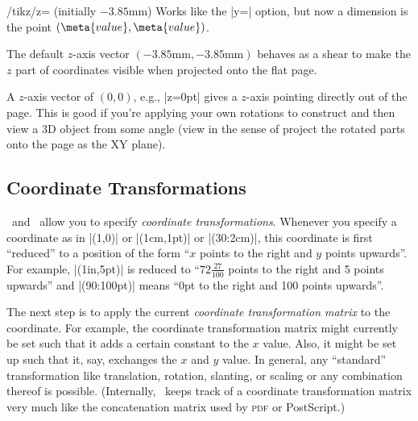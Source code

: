 \begin{key}{/tikz/z= (initially \normalfont$-3.85$mm)}
    Works like the |y=| option, but now a dimension is the point
    $(\meta{value},\meta{value})$.

    The default $z$-axis vector $(-3.85\text{mm},-3.85\text{mm})$ behaves as a
    shear to make the $z$ part of coordinates visible when projected onto the
    flat page.

    A $z$-axis vector of $(0,0)$, e.g., |z=0pt| gives a $z$-axis pointing
    directly out of the page.  This is good if you're applying your own
    rotations to construct and then view a 3D object from some angle (view in
    the sense of project the rotated parts onto the page as the XY plane).
\begin{codeexample}[]
\end{codeexample}
\end{key}


\subsection{Coordinate Transformations}

\pgfname\ and \tikzname\ allow you to specify \emph{coordinate
transformations}. Whenever you specify a coordinate as in |(1,0)| or
|(1cm,1pt)| or |(30:2cm)|, this coordinate is first ``reduced'' to a position
of the form ``$x$ points to the right and $y$ points upwards''. For example,
|(1in,5pt)| is reduced to ``$72\frac{27}{100}$ points to the right and 5 points
upwards'' and |(90:100pt)| means ``0pt to the right and 100 points upwards''.

The next step is to apply the current \emph{coordinate transformation matrix}
to the coordinate. For example, the coordinate transformation matrix might
currently be set such that it adds a certain constant to the $x$ value. Also,
it might be set up such that it, say, exchanges the $x$ and $y$ value. In
general, any ``standard'' transformation like translation, rotation, slanting,
or scaling or any combination thereof is possible. (Internally, \pgfname\ keeps
track of a coordinate transformation matrix very much like the concatenation
matrix used by \textsc{pdf} or PostScript.)
%
\begin{codeexample}[]
\end{codeexample}

